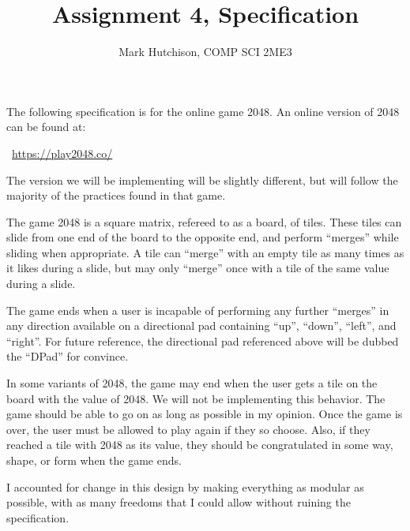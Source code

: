 \documentclass[12pt]{article}
\title{Assignment 4, Specification}
\author{Mark Hutchison, COMP SCI 2ME3}
\begin{document}
\maketitle

The following specification is for the online game 2048. An online version of 2048 can be found at:

~\newline \href {https://play2048.co/} {https://play2048.co/} ~\newline

The version we will be implementing will be slightly different, but will follow the majority of the practices found in that game.

The game 2048 is a square matrix, refereed to as a board, of tiles. These tiles can slide from one end of the board to the opposite end, and perform ``merges'' while sliding when appropriate. A tile can ``merge'' with an empty tile as many times as it likes during a slide, but may only ``merge'' once with a tile of the same value during a slide.

The game ends when a user is incapable of performing any further ``merges'' in any direction available on a directional pad containing ``up'', ``down'', ``left'', and ``right''. For future reference, the directional pad referenced above will be dubbed the ``DPad'' for convince.

In some variants of 2048, the game may end when the user gets a tile on the board with the value of 2048. We will not be implementing this behavior. The game should be able to go on as long as possible in my opinion. Once the game is over, the user must be allowed to play again if they so choose. Also, if they reached a tile with 2048 as its value, they should be congratulated in some way, shape, or form when the game ends.

I accounted for change in this design by making everything as modular as possible, with as many freedoms that I could allow without ruining the specification.
\end{document}
